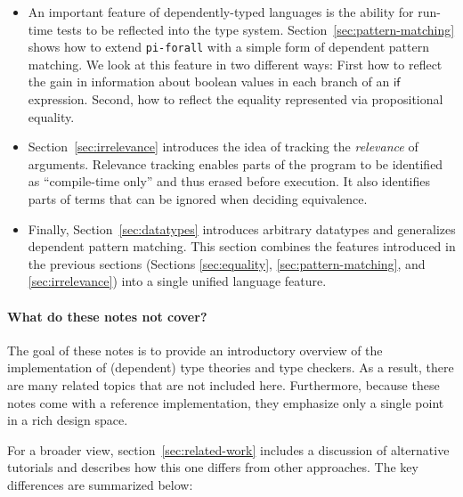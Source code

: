 \documentclass{article}
\newcommand\pif{\texttt{pi-forall}\xspace}
\theoremstyle{definition}
\begin{document}
\begin{itemize}
\item An important feature of dependently-typed languages is the ability for
  run-time tests to be reflected into the type
  system. Section~\ref{sec:pattern-matching} shows how to extend \pif with a
  simple form of dependent pattern matching. We look at this feature in two
  different ways: First how to reflect the gain in information about boolean
  values in each branch of an $\mathsf{if}$ expression. Second, how to reflect the
  equality represented via propositional equality.

\item Section~\ref{sec:irrelevance} introduces the idea of tracking the
  \emph{relevance} of arguments. Relevance tracking enables parts of the
  program to be identified as ``compile-time only'' and thus erased before
  execution. It also identifies parts of terms that can be ignored when
  deciding equivalence.


\item Finally, Section~\ref{sec:datatypes} introduces arbitrary datatypes and
  generalizes dependent pattern matching. This section combines the features
  introduced in the previous sections (Sections \ref{sec:equality},
  \ref{sec:pattern-matching}, and \ref{sec:irrelevance}) into a single unified
  language feature.
\end{itemize}


\paragraph{What do these notes \textbf{not} cover?}
The goal of these notes is to provide an introductory overview of the
implementation of (dependent) type theories and type checkers. As a result,
there are many related topics that are not included here. Furthermore, because
these notes come with a reference implementation, they emphasize only a single
point in a rich design space.

For a broader view, section~\ref{sec:related-work} includes a discussion of
alternative tutorials and describes how this one differs from other
approaches.  The key differences are summarized below:
\end{document}
